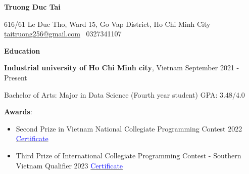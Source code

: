 \documentclass[11pt]{article}
\begin{document}
    
    \begin{center}
        \LARGE \textbf{Truong Duc Tai}\\
    \end{center}
    
    
    \begin{center}
        616/61 Le Duc Tho, Ward 15, Go Vap District, Ho Chi Minh City \hspace{1em} \textbullet \href{mailto:taitruong256@gmail.com}{taitruong256@gmail.com} \hspace{1em}         
        \textbullet\ 0327341107 \hspace{1em}  
    \end{center}
    
    
    \begin{center}
        \hrulefill
    \end{center}
    














    
    
    \begin{center}
        \textbf{Education}
    \end{center}
    
    \textbf{Industrial university of Ho Chi Minh city}, Vietnam \hfill September 2021 - Present
    
    Bachelor of Arts: Major in Data Science (Fourth year student) \hfill GPA: 3.48/4.0 
    
    \textbf{Awards}:  
    \begin{itemize}  
        \item Second Prize in Vietnam National Collegiate Programming Contest 2022  
        \hfill \href{https://github.com/taitruong256/Competitive-programming/blob/main/Bang-khen-giai-Nhi-Olympic-Tin-hoc-Sinh-vien-Viet-Nam-2022-khoi-Chuyen-tin.jpg}{\textcolor{blue}{Certificate}}  
    
        \item Third Prize of International Collegiate Programming Contest - Southern Vietnam Qualifier 2023  
        \hfill \href{https://github.com/taitruong256/Competitive-programming/blob/main/2024-ICPC-Vietnam-Southern-Provincial-PC-MEDAL.pdf}{\textcolor{blue}{Certificate}}
    \end{itemize}  
    
\end{document}
